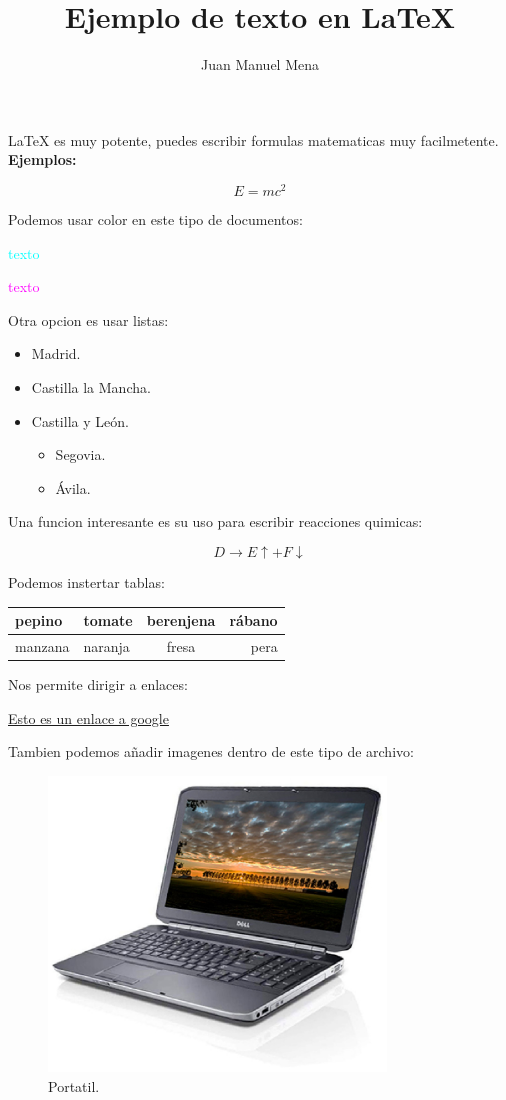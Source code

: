 \documentclass [12pt,a4paper] {article}
\title{ Ejemplo de texto en LaTeX}
\author{ Juan Manuel Mena }
\begin{document}
\maketitle 
\LaTeX{} es muy potente, puedes escribir formulas matematicas muy facilmetente.
\textbf{Ejemplos: }

\begin{displaymath}
  E= m c^2 
\end{displaymath}

Podemos usar color en este tipo de documentos:

\textcolor{cyan}{texto}

\textcolor{magenta}{texto}

Otra opcion es usar listas:

\begin{itemize}
    \item Madrid.
    \item Castilla la Mancha.
    \item Castilla y León.
    \begin{itemize}
         \item Segovia.
         \item Ávila.
    \end{itemize}
\end{itemize}

Una funcion interesante es su uso para escribir reacciones quimicas:

\begin{equation}
D \rightarrow E\uparrow + F\downarrow
\end{equation}

Podemos instertar tablas:

\vspace{5mm}
\begin{tabular}{llcr}
\hline
pepino & tomate & berenjena & rábano  \\
\hline
manzana & naranja & fresa & pera \\
\hline
\end{tabular}

\vspace{5mm}

Nos permite dirigir a enlaces:

\vspace{5mm}
\href{ https://www.google.com }{Esto es un enlace a google} 
\vspace{5mm}

Tambien podemos añadir imagenes dentro de este tipo de archivo:

\begin{figure}
\centering
\includegraphics[width=0.8\textwidth]{./dell}
\caption{Portatil.} \label{fig:Dell}
\end{figure}
\end{document}
